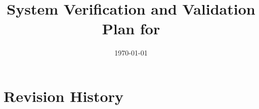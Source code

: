 \documentclass[12pt, titlepage]{article}
\begin{document}
\title{%
  System Verification and Validation Plan for \progname{}}
\author{\authname}
\date{\today}

\maketitle


\tableofcontents

\listoftables

\listoffigures
{}

\newpage

\section{Revision History}
\end{document}
